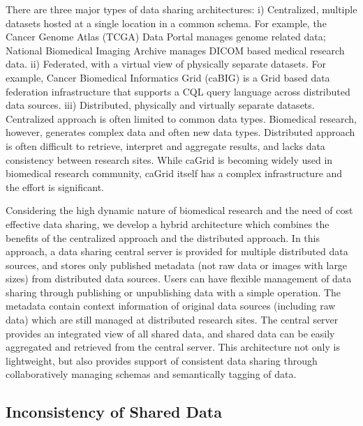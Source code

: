 \documentclass{singlecol-new}
\theoremstyle{TH}{
\newtheorem{lemma}{Lemma}
\newtheorem{theorem}[lemma]{Theorem}
\newtheorem{corrolary}[lemma]{Corrolary}
\newtheorem{conjecture}[lemma]{Conjecture}
\newtheorem{proposition}[lemma]{Proposition}
\newtheorem{claim}[lemma]{Claim}
\newtheorem{stheorem}[lemma]{Wrong Theorem}
\newtheorem{algorithm}{Algorithm}
}
\theoremstyle{THrm}{
\newtheorem{definition}{Definition}[section]
\newtheorem{question}{Question}[section]
\newtheorem{remark}{Remark}
\newtheorem{scheme}{Scheme}
}
\theoremstyle{THhit}{
\newtheorem{case}{Case}[section]
}
\begin{document}
There are three major types of data sharing architectures: i)
Centralized, multiple datasets hosted at a single location in a
common schema. For example, the Cancer Genome Atlas (TCGA) Data
Portal \cite{tcga} manages genome related data; National Biomedical
Imaging Archive \cite{nbia} manages DICOM based medical research
data. ii) Federated, with a virtual view of physically separate
datasets. For example, Cancer Biomedical Informatics Grid
(caBIG{\small \textregistered})  \cite{cabig} is a Grid based data
federation infrastructure that supports a CQL query language across
distributed data sources.  iii) Distributed, physically and
virtually separate datasets.  Centralized approach is often limited
to common data types. Biomedical research, however,  generates
complex data and often new data types.  Distributed approach is
often difficult to retrieve, interpret and aggregate results, and
lacks data consistency between research sites.  While caGrid is
becoming widely used in biomedical research community, caGrid itself
has a complex infrastructure and the effort is significant.


Considering the high dynamic nature of biomedical research and the
need of  cost effective data sharing, we develop a hybrid
architecture which combines the benefits of the centralized approach
and the distributed approach. In this approach, a data sharing
central server is provided for multiple distributed data sources,
and stores only published metadata (not raw data or images with
large sizes) from distributed data sources. Users can have flexible
management of data sharing through publishing or unpublishing data
with  a simple operation. The metadata contain context information
of original data sources (including raw data) which are still
managed at distributed research sites. The central server provides
an integrated view of all shared data, and shared data can be easily
aggregated and retrieved from the central server. This architecture
not only is lightweight, but also provides support of consistent
data sharing through collaboratively managing schemas and
semantically tagging of data.

\subsection{Inconsistency of Shared Data}
\end{document}
